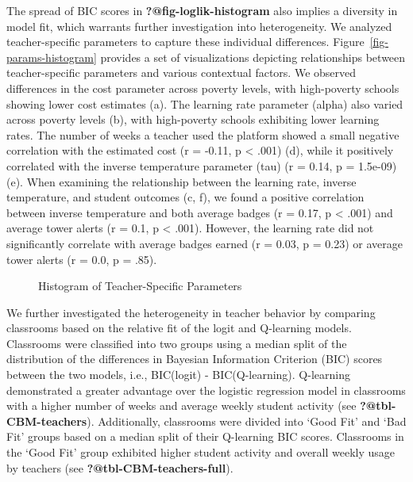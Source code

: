 \documentclass[
  number,
  preprint,
  3p,
  onecolumn]{elsarticle}
\begin{document}
The spread of BIC scores in \textbf{?@fig-loglik-histogram} also implies
a diversity in model fit, which warrants further investigation into
heterogeneity. We analyzed teacher-specific parameters to capture these
individual differences. Figure~\ref{fig-params-histogram} provides a set
of visualizations depicting relationships between teacher-specific
parameters and various contextual factors. We observed differences in
the cost parameter across poverty levels, with high-poverty schools
showing lower cost estimates (a). The learning rate parameter (alpha)
also varied across poverty levels (b), with high-poverty schools
exhibiting lower learning rates. The number of weeks a teacher used the
platform showed a small negative correlation with the estimated cost (r
= -0.11, p \textless{} .001) (d), while it positively correlated with
the inverse temperature parameter (tau) (r = 0.14, p = 1.5e-09) (e).
When examining the relationship between the learning rate, inverse
temperature, and student outcomes (c, f), we found a positive
correlation between inverse temperature and both average badges (r =
0.17, p \textless{} .001) and average tower alerts (r = 0.1, p
\textless{} .001). However, the learning rate did not significantly
correlate with average badges earned (r = 0.03, p = 0.23) or average
tower alerts (r = 0.0, p = .85).

\begin{figure}

\begin{minipage}{0.33\linewidth}
Histogram of Teacher-Specific Parameters\end{minipage}%

\end{figure}%

We further investigated the heterogeneity in teacher behavior by
comparing classrooms based on the relative fit of the logit and
Q-learning models. Classrooms were classified into two groups using a
median split of the distribution of the differences in Bayesian
Information Criterion (BIC) scores between the two models, i.e.,
BIC(logit) - BIC(Q-learning). Q-learning demonstrated a greater
advantage over the logistic regression model in classrooms with a higher
number of weeks and average weekly student activity (see
\textbf{?@tbl-CBM-teachers}). Additionally, classrooms were divided into
`Good Fit' and `Bad Fit' groups based on a median split of their
Q-learning BIC scores. Classrooms in the `Good Fit' group exhibited
higher student activity and overall weekly usage by teachers (see
\textbf{?@tbl-CBM-teachers-full}).
\end{document}
